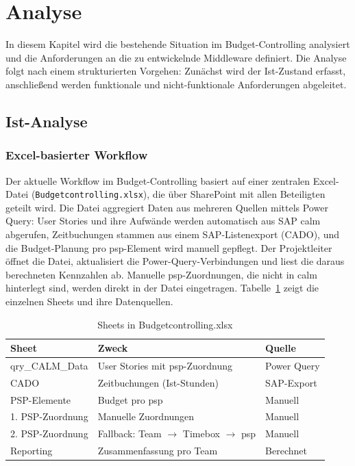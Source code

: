 \section{Analyse}

In diesem Kapitel wird die bestehende Situation im Budget-Controlling analysiert und die Anforderungen an die zu entwickelnde Middleware definiert. Die Analyse folgt nach \cite{sommerville2015} einem strukturierten Vorgehen: Zunächst wird der Ist-Zustand erfasst, anschließend werden funktionale und nicht-funktionale Anforderungen abgeleitet.

\subsection{Ist-Analyse}

\subsubsection{Excel-basierter Workflow}

Der aktuelle Workflow im Budget-Controlling basiert auf einer zentralen Excel-Datei (\texttt{Budgetcontrolling.xlsx}), die über SharePoint mit allen Beteiligten geteilt wird. Die Datei aggregiert Daten aus mehreren Quellen mittels Power Query: User Stories und ihre Aufwände werden automatisch aus SAP \gls{calm} abgerufen, Zeitbuchungen stammen aus einem SAP-Listenexport (CADO), und die Budget-Planung pro \gls{psp}-Element wird manuell gepflegt. Der Projektleiter öffnet die Datei, aktualisiert die Power-Query-Verbindungen und liest die daraus berechneten Kennzahlen ab. Manuelle \gls{psp}-Zuordnungen, die nicht in \gls{calm} hinterlegt sind, werden direkt in der Datei eingetragen. Tabelle~\ref{tab:excel-sheets} zeigt die einzelnen Sheets und ihre Datenquellen.

\begin{table}[H]
\centering
\caption{Sheets in Budgetcontrolling.xlsx}
\label{tab:excel-sheets}
\begin{tabularx}{\textwidth}{l>{\raggedright\arraybackslash}Xl}
\toprule
\textbf{Sheet} & \textbf{Zweck} & \textbf{Quelle} \\
\midrule
qry\_CALM\_Data & User Stories mit \gls{psp}-Zuordnung & Power Query \\
CADO & Zeitbuchungen (Ist-Stunden) & SAP-Export \\
PSP-Elemente & Budget pro \gls{psp} & Manuell \\
1. PSP-Zuordnung & Manuelle Zuordnungen & Manuell \\
2. PSP-Zuordnung & Fallback: Team $\rightarrow$ Timebox $\rightarrow$ \gls{psp} & Manuell \\
Reporting & Zusammenfassung pro Team & Berechnet \\
\bottomrule
\end{tabularx}
\end{table}

